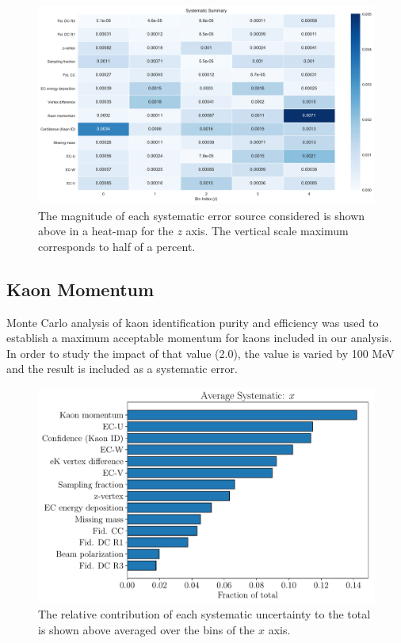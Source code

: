 \begin{figure}
	\label{fig:systematic_heatmap_z}
	\begin{center}
		\includegraphics[width=\textwidth]{image/plots/kaon-bsa/systematics_integrated_heatmap_z.pdf}
		\caption{The magnitude of each systematic error source considered is shown above in a heat-map for the $z$ axis.  The vertical scale maximum corresponds to half of a percent.}
	\end{center}
\end{figure}

\subsection{Kaon Momentum}
Monte Carlo analysis of kaon identification purity and efficiency was used to establish a maximum acceptable momentum for kaons included in our analysis.  In order to study the impact of that value (2.0), the value is varied by 100 MeV and the result is included as a systematic error.  

\begin{figure}
	\centering
	\includegraphics[width=16cm]{image/plots/kaon-bsa/bar-systematics-x.pdf}
	\caption{The relative contribution of each systematic uncertainty to the total is shown above averaged over the bins of the $x$ axis.}
\end{figure}

